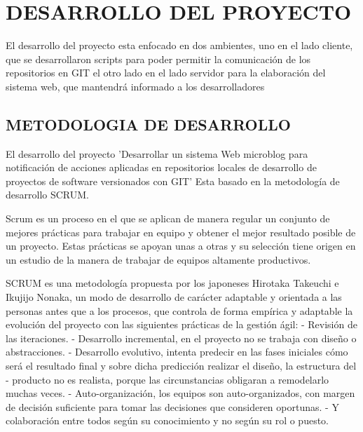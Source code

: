 

%
\chapter{DESARROLLO DEL PROYECTO}
El desarrollo del proyecto esta enfocado en dos ambientes, uno en el lado cliente, que se desarrollaron scripts para poder permitir la comunicación de los repositorios en GIT
el otro lado en el lado servidor para la elaboración del sistema web, que mantendrá informado a los desarrolladores
\section{METODOLOGIA DE DESARROLLO}
El desarrollo del proyecto 'Desarrollar un sistema Web microblog para notificación de acciones aplicadas en repositorios locales de desarrollo de proyectos de software versionados con GIT' Esta basado en la metodología de desarrollo SCRUM.

Scrum es un proceso en el que se aplican de manera regular un conjunto de mejores prácticas para trabajar en equipo y obtener el mejor resultado posible de un proyecto. Estas prácticas se apoyan unas a otras y su selección tiene origen en un estudio de la manera de trabajar de equipos altamente productivos.

SCRUM es una metodología propuesta por los japoneses Hirotaka Takeuchi e Ikujijo Nonaka, un modo de desarrollo de carácter adaptable y orientada a las personas antes
que a los procesos, que controla de forma empírica y adaptable la evolución del proyecto con las siguientes prácticas de la gestión ágil:
       - Revisión de las iteraciones.
       - Desarrollo incremental, en el proyecto no se trabaja con diseño o
        abstracciones.
       - Desarrollo evolutivo, intenta predecir en las fases iniciales cómo será el
         resultado final y sobre dicha predicción realizar el diseño, la estructura del
        - producto no es realista, porque las circunstancias obligaran a remodelarlo
          muchas veces.
       - Auto-organización, los equipos son auto-organizados, con margen de decisión
         suficiente para tomar las decisiones que consideren oportunas.
       - Y colaboración entre todos según su conocimiento y no según su rol o puesto.


